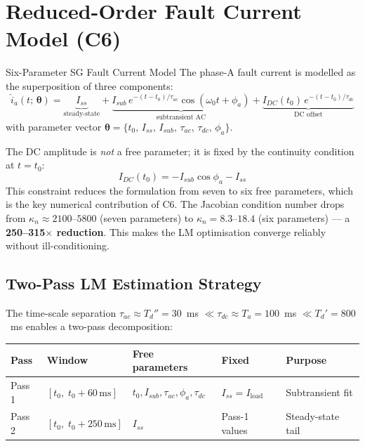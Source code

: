 \documentclass[12pt,a4paper]{article}
\begin{document}
\section{Reduced-Order Fault Current Model (C6)}

\begin{formulabox}{Six-Parameter SG Fault Current Model}
The phase-A fault current is modelled as the superposition of three components:
\begin{equation}
  \hat{i}_a(t;\,\bm{\theta}) = \underbrace{I_{ss}}_{\text{steady-state}}
    + \underbrace{I_{sub}\,e^{-(t-t_0)/\tau_{ac}}\cos(\omega_0 t + \phi_a)}_{\text{subtransient AC}}
    + \underbrace{I_{DC}(t_0)\,e^{-(t-t_0)/\tau_{dc}}}_{\text{DC offset}}
  \label{eq:fault_model}
\end{equation}
with parameter vector $\bm{\theta} = \{t_0,\, I_{ss},\, I_{sub},\, \tau_{ac},\, \tau_{dc},\, \phi_a\}$.

The DC amplitude is \emph{not} a free parameter; it is fixed by the continuity condition at $t = t_0$:
\begin{equation}
  I_{DC}(t_0) = -I_{sub}\cos\phi_a - I_{ss}
  \label{eq:dc_continuity}
\end{equation}
This constraint reduces the formulation from seven to six free parameters, which is the key numerical contribution of C6. The Jacobian condition number drops from $\kappa_n \approx 2100$--$5800$ (seven parameters) to $\kappa_n = 8.3$--$18.4$ (six parameters) --- a \textbf{250--315$\times$ reduction}. This makes the LM optimisation converge reliably without ill-conditioning.
\end{formulabox}

\subsection{Two-Pass LM Estimation Strategy}

The time-scale separation $\tau_{ac} \approx T_d'' = 30$~ms $\ll \tau_{dc} \approx T_a = 100$~ms $\ll T_d' = 800$~ms enables a two-pass decomposition:

\begin{center}
\begin{tabular}{@{}lllll@{}}
\toprule
\textbf{Pass} & \textbf{Window} & \textbf{Free parameters} & \textbf{Fixed} & \textbf{Purpose} \\
\midrule
Pass 1 & $[t_0,\; t_0+60\,\mathrm{ms}]$ & $t_0, I_{sub}, \tau_{ac}, \phi_a, \tau_{dc}$ & $I_{ss} = I_\mathrm{load}$ & Subtransient fit \\
Pass 2 & $[t_0,\; t_0+250\,\mathrm{ms}]$ & $I_{ss}$ & Pass-1 values & Steady-state tail \\
\bottomrule
\end{tabular}
\end{center}
\end{document}
